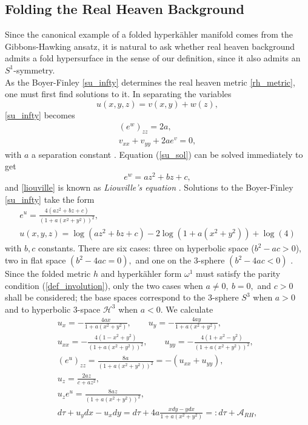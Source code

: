 \documentclass[a4paper,12pt, onecolumn, notitlepage]{article}
\theoremstyle{definition}
\theoremstyle{remark}
\newcommand{\w}{\omega}
\newcommand{\HK}{hyperk\"ahler }
\begin{document}
\subsection{Folding the Real Heaven Background}
Since the canonical example of a folded \HK manifold comes from the Gibbons-Hawking ansatz, it is natural to ask whether real heaven background admits a fold hypersurface in the sense of our definition, since it also admits an $S^{1}$-symmetry.\\
As the Boyer-Finley \cref{su_infty} determines the real heaven metric \cref{rh_metric}, one must first find solutions to it. In separating the variables
\begin{equation*}
	u(x,y,z) = v(x,y) + w(z),
\end{equation*}
\cref{su_infty} becomes
\begin{subequations}
	\begin{gather}
	\label{su_sol}
	(e^{w})_{zz} = 2a,\\
	\label{liouville}
	v_{xx} + v_{yy} + 2ae^{v}=0,
	\end{gather}
\end{subequations}
with $a$ a separation constant \cite{tod_1995}. Equation (\ref{su_sol}) can be solved immediately to get
\begin{equation*}
	e^{w} = az^{2} + bz + c,
\end{equation*}
and \cref{liouville} is known as \emph{Liouville's equation} \cite{tod_1995}. Solutions to the Boyer-Finley \cref{su_infty} take the form
\begin{gather*}
	e^{u}=\frac{4(az^{2}+bz+c)}{(1+a(x^{2}+y^{2}))^{2}},\\
	u(x,y,z) = \log(az^{2}+bz+c)-2\log(1+a(x^{2}+y^{2})) +\log(4)
\end{gather*}
with $b,c$ constants. There are six cases: three on hyperbolic space ($b^{2}-ac>0$), two in flat space $(b^{2}-4ac=0),$ and one on the 3-sphere $(b^{2}-4ac<0)$ \cite{tod_1995}. Since the folded metric $h$ and \HK form $\w^{1}$ must satisfy the parity condition (\ref{def_involution}), only the two cases when $a\neq 0,\ b=0,$ and $c>0$ shall be considered; the base spaces correspond to the 3-sphere $S^{3}$ when $a>0$ and to hyperbolic 3-space $\mathcal{H}^{3}$ when $a<0.$ We calculate
\begin{subequations}
	\begin{gather*}
	u_{x} = -\frac{4ax}{1+a(x^{2} + y^{2})}, \qquad u_{y} = -\frac{4ay}{1+a(x^{2} + y^{2})},\\
	u_{xx} = -\frac{4(1-x^{2}+y^{2})}{(1+a(x^{2} + y^{2}))^{2}},\qquad u_{yy} = -\frac{4(1+x^{2}-y^{2})}{(1+a(x^{2} + y^{2}))^{2}},\\
	(e^{u})_{zz} = \frac{8a}{(1+a(x^{2} + y^{2}))^{2}} = -(u_{xx} + u_{yy}),\\
	u_{z} = \frac{2az}{c+az^{2}},\\
	u_{z}e^{u} = \frac{8az}{(1+a(x^{2} + y^{2}))^{2}},\\
	d\tau + u_{y}dx-u_{x}dy = d\tau + 4a\frac{xdy-ydx}{1+a(x^{2} + y^{2})} =: d\tau + \mathcal{A}_{RH},
	\end{gather*}
\end{subequations}
\end{document}
